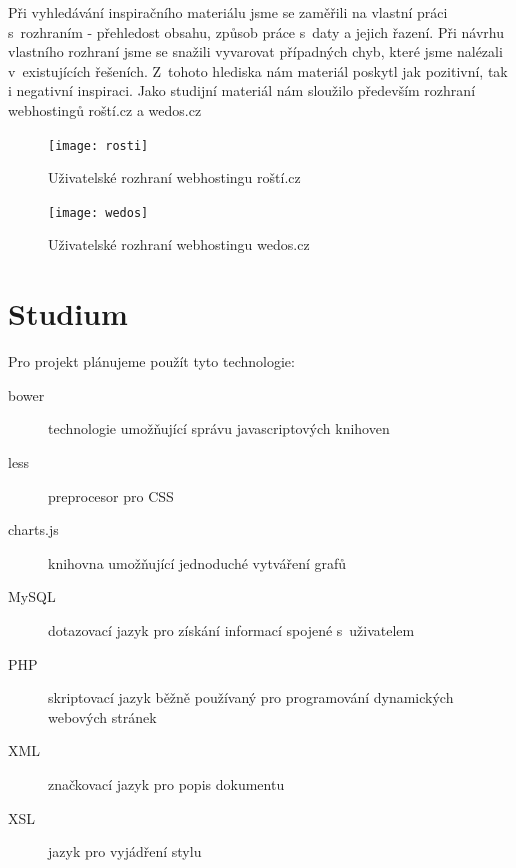 \documentclass[11pt,a4paper]{article}
\begin{document}
    Při vyhledávání inspiračního materiálu jsme se zaměřili na vlastní práci
s~rozhraním - přehledost obsahu, způsob práce s~daty a jejich řazení.
    Při návrhu vlastního rozhraní jsme se snažili vyvarovat případných chyb,
    které jsme nalézali v~existujících řešeních. Z~tohoto hlediska nám
    materiál poskytl jak pozitivní, tak i negativní inspiraci.  Jako studijní
    materiál nám sloužilo především rozhraní webhostingů roští.cz a wedos.cz \\
    \begin{figure}[ht]
      \begin{center}
        \texttt{[image: rosti]}
        \caption{Uživatelské rozhraní webhostingu roští.cz}
      \end{center}
    \end{figure}
    \begin{figure}[ht]
      \begin{center}
        \texttt{[image: wedos]}
        \caption{Uživatelské rozhraní webhostingu wedos.cz}
      \end{center}
    \end{figure}

  \section{Studium}

    Pro projekt plánujeme použít tyto technologie:
    \begin{description}
      \item[bower] technologie umožňující správu javascriptových knihoven
      \item[less] preprocesor pro CSS
      \item[charts.js] knihovna umožňující jednoduché vytváření grafů
      \item[MySQL] dotazovací jazyk pro získání informací spojené s~uživatelem
      \item[PHP] skriptovací jazyk běžně používaný pro programování
                   dynamických webových stránek
      \item[XML] značkovací jazyk pro popis dokumentu
      \item[XSL] jazyk pro vyjádření stylu
    \end{description}

\end{document}
